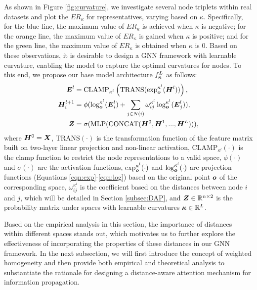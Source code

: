 As shown in Figure \ref{fig:curvature}, we investigate several node triplets within real datasets and plot the $ER_\kappa$ for representatives, varying based on $\kappa$. Specifically, for the blue line, the maximum value of $ER_\kappa$ is achieved when $\kappa$ is negative; for the orange line, the maximum value of $ER_\kappa$ is gained when $\kappa$ is positive; and for the green line, the maximum value of $ER_\kappa$ is obtained when $\kappa$ is 0. Based on these observations, it is desirable to design a GNN framework with learnable curvature, enabling the model to capture the optimal curvatures for nodes. To this end, we propose our base model architecture $f^L_{\boldsymbol{\kappa}}$ as follows: 
\begin{equation}\label{eqn:architecture}
\begin{aligned}
    \boldsymbol{{\color{black} E}}^l&=\text{CLAMP}_{\kappa^{l}}\left( \text{TRANS}(\exp^{\kappa^l}_{\boldsymbol{o}}(\boldsymbol{H}^l))\right), \\
    \boldsymbol{H}_i^{l+1}&=\phi(\log^{\kappa^l}_{\boldsymbol{o}}(\boldsymbol{{\color{black} E}}_i^l) + \sum_{j\in N(i)}\omega_{ij}^{\kappa^l}\log^{\kappa^l}_{\boldsymbol{o}}(\boldsymbol{{\color{black} E}}_j^l)), \\
    \boldsymbol{Z}&=\sigma(\text{MLP}(\text{CONCAT}(\boldsymbol{H}^{0}, \boldsymbol{H}^{1}, ..., \boldsymbol{H}^{L}))), 
\end{aligned}
\end{equation}
where $\boldsymbol{H}^0=\boldsymbol{X}$, $\text{TRANS}(\cdot)$ is the transformation function of the feature matrix built on two-layer linear projection and non-linear activation, $\text{CLAMP}_{\kappa^l}(\cdot)$ is the clamp function to restrict the node representations to a valid space, $\phi(\cdot)$ and $\sigma(\cdot)$ are the activation functions, $\exp^{\kappa^l}_{\boldsymbol{o}}(\cdot)$ and $\log^{\kappa^l}_{\boldsymbol{o}}(\cdot)$ are projection functions (Equations \ref{eqn:exp}-\ref{eqn:log}) based on the original point $\boldsymbol{o}$ of the corresponding space, $\omega_{ij}^{\kappa^l}$ is the coefficient based on the distances between node $i$ and $j$, which will be detailed in Section \ref{subsec:DAP}, and $\boldsymbol{Z}\in \mathbb{R}^{n\times2}$ is the probability matrix under spaces with learnable curvatures $\boldsymbol{\kappa} \in \mathbb{R}^L$. 

Based on the empirical analysis in this section, the importance of distances within different spaces stands out, which motivates us to further explore the effectiveness of incorporating the properties of these distances in our GNN framework. In the next subsection, we will first introduce the concept of weighted homogeneity and then provide both empirical and theoretical analysis to substantiate the rationale for designing a distance-aware attention mechanism for information propagation. 

